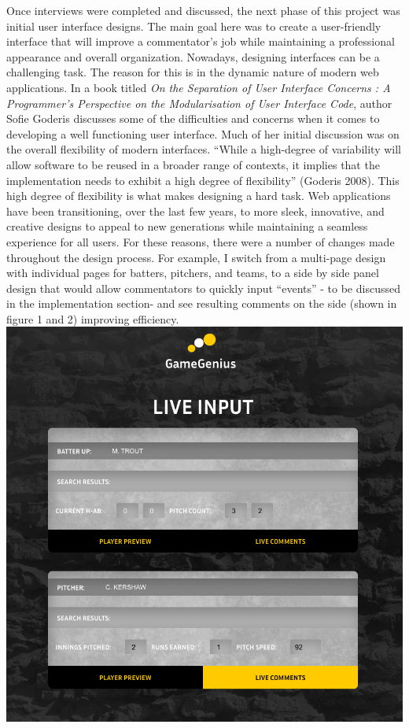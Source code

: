 \documentclass[10pt,twocolumn]{article}
\begin{document}
Once interviews were completed and discussed, the next phase of this project was initial user interface designs. The main goal here was to create a user-friendly interface that will improve a commentator’s job while maintaining a professional appearance and overall organization. Nowadays, designing interfaces can be a challenging task. The reason for this is in the dynamic nature of modern web applications. In a book titled \textit{On the Separation of User Interface Concerns : A Programmer's Perspective on the Modularisation of User Interface Code}, author Sofie Goderis discusses some of the difficulties and concerns when it comes to developing a well functioning user interface. Much of her initial discussion was on the overall flexibility of modern interfaces. “While a high-degree of variability will allow software to be reused in a broader range of contexts, it implies that the implementation needs to exhibit a high degree of ﬂexibility” (Goderis 2008). \cite{sofie2008} This high degree of flexibility is what makes designing a hard task. Web applications have been transitioning, over the last few years, to more sleek, innovative, and creative designs to appeal to new generations while maintaining a seamless experience for all users. \break
\indent For these reasons, there were a number of changes made throughout the design process. For example, I switch from a multi-page design with individual pages for batters, pitchers, and teams, to a side by side panel design that would allow commentators to quickly input “events” - to be discussed in the implementation section- and see resulting comments on the side (shown in figure 1 and 2) improving efficiency. 
\includegraphics[scale=0.24]{images/input.png}
\end{document}
